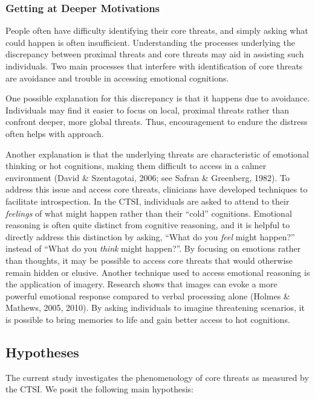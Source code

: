 \documentclass[
  man,floatsintext]{apa7}
\begin{document}
\subsubsection{Getting at Deeper Motivations}\label{getting-at-deeper-motivations}

People often have difficulty identifying their core threats, and simply asking what could happen is often insufficient.
Understanding the processes underlying the discrepancy between proximal threats and core threats may aid in assisting such individuals.
Two main processes that interfere with identification of core threats are avoidance and trouble in accessing emotional cognitions.

One possible explanation for this discrepancy is that it happens due to avoidance.
Individuals may find it easier to focus on local, proximal threats rather than confront deeper, more global threats.
Thus, encouragement to endure the distress often helps with approach.

Another explanation is that the underlying threats are characteristic of emotional thinking or hot cognitions, making them difficult to access in a calmer environment (David \& Szentagotai, 2006; see Safran \& Greenberg, 1982).
To address this issue and access core threats, clinicians have developed techniques to facilitate introspection.
In the CTSI, individuals are asked to attend to their \emph{feelings} of what might happen rather than their ``cold'' cognitions.
Emotional reasoning is often quite distinct from cognitive reasoning, and it is helpful to directly address this distinction by asking, ``What do you \emph{feel} might happen?'' instead of ``What do you \emph{think} might happen?''.
By focusing on emotions rather than thoughts, it may be possible to access core threats that would otherwise remain hidden or elusive.
Another technique used to access emotional reasoning is the application of imagery.
Research shows that images can evoke a more powerful emotional response compared to verbal processing alone (Holmes \& Mathews, 2005, 2010).
By asking individuals to imagine threatening scenarios, it is possible to bring memories to life and gain better access to hot cognitions.

\subsection{Hypotheses}\label{hypotheses}

The current study investigates the phenomenology of core threats as measured by the CTSI.
We posit the following main hypothesis:
\end{document}
